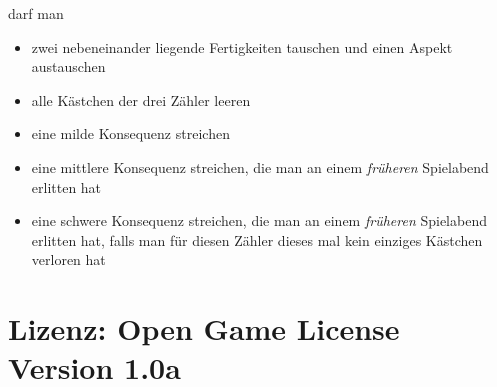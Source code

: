 \documentclass{tufte-handout}
\begin{document}
 darf man

\begin{itemize}
\item zwei nebeneinander liegende Fertigkeiten tauschen und einen
  Aspekt austauschen
\item alle Kästchen der drei Zähler leeren
\item eine milde Konsequenz streichen
\item eine mittlere Konsequenz streichen, die man an einem \textit{früheren}
  Spielabend erlitten hat
\item eine schwere Konsequenz streichen, die man an einem
  \textit{früheren} Spielabend erlitten hat, falls man für diesen
  Zähler dieses mal kein einziges Kästchen verloren hat
\end{itemize}

\clearpage


\section{Lizenz: Open Game License Version 1.0a}

\fontsize{7.5pt}{8pt}\selectfont
\end{document}
